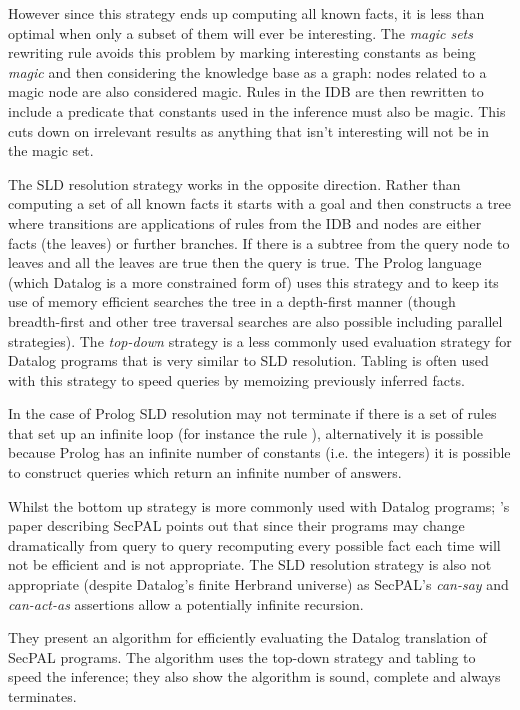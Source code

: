 \documentclass[a4paper]{article}
\begin{document}
However since this strategy ends up computing all known facts, it is less than
optimal when only a subset of them will ever be interesting.  The \emph{magic
sets}\cite{Bancilhon:1985cz} rewriting rule avoids this problem by marking
interesting constants as being \emph{magic} and then considering the knowledge
base as a graph: nodes related to a magic node are also considered magic.  Rules
in the \ac{IDB} are then rewritten to include a predicate that constants used in
the inference must also be magic.  This cuts down on irrelevant results as
anything that isn't interesting will not be in the magic set.

The \ac{SLD} resolution strategy works in the opposite direction.  Rather than
computing a set of all known facts it starts with a goal and then constructs a
tree where transitions are applications of rules from the \ac{IDB} and nodes are
either facts (the leaves) or further branches.  If there is a subtree from the
query node to leaves and all the leaves are true then the query is true.  The
Prolog language (which Datalog is a more constrained form of) uses this strategy
and to keep its use of memory efficient searches the tree in a depth-first
manner (though breadth-first and other tree traversal searches are also possible
including parallel strategies).  
The \emph{top-down} strategy is a less commonly used evaluation strategy for Datalog
programs that is very similar to \ac{SLD} resolution. Tabling is often used with
this strategy to speed queries by memoizing previously inferred facts.

In the case of Prolog \ac{SLD} resolution may
not terminate if there is a set of rules that set up an infinite loop (for
instance the rule ),
alternatively it is possible because Prolog has an infinite number of constants
(i.e. the integers) it is possible to construct queries which return an infinite
number of answers.

Whilst the bottom up strategy is more commonly used with Datalog programs;
\citeauthor*{Becker:2009vt}'s paper describing SecPAL\cite{Becker:2010vh} points out that since
their programs may change dramatically from query to query recomputing every
possible fact each time  will not be efficient and is not appropriate.  The
\ac{SLD} resolution strategy is also not appropriate (despite Datalog's finite
Herbrand universe) as SecPAL's \emph{can-say} and \emph{can-act-as} assertions
allow a potentially infinite recursion.

They present an algorithm for efficiently evaluating the Datalog translation of
SecPAL programs.  The algorithm uses the top-down strategy and tabling to speed
the inference; they also show the algorithm is sound, complete and always
terminates. 
\end{document}
